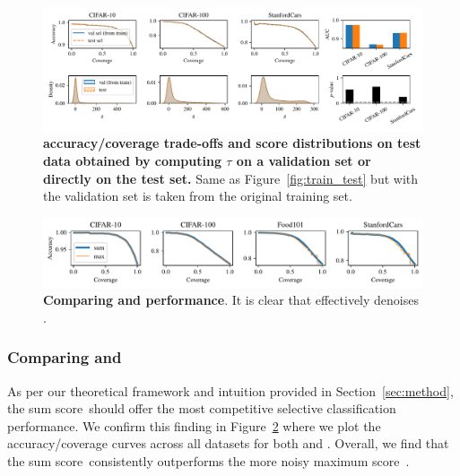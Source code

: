 \begin{figure}[t]
  \centering
  \includegraphics[width=\linewidth]{figs/sptd/train_test_nntd_train.pdf}
\caption[\sptd accuracy/coverage trade-offs and score distributions on test data obtained by computing $\tau$ on a validation set or directly on the test set.]{\textbf{\sptd accuracy/coverage trade-offs and score distributions on test data obtained by computing $\tau$ on a validation set or directly on the test set.} Same as Figure~\ref{fig:train_test} but with the validation set is taken from the original training set.
}
\label{fig:train_test_nntd_train}
\end{figure}

\begin{figure}[t]
\centering
  \includegraphics[width=\linewidth]{figs/sptd/max_sum.pdf}
\caption[\textbf{Comparing \smax and \ssum performance}. It is clear that \ssum effectively denoises \smax.]{\textbf{Comparing \smax and \ssum performance}. It is clear that \ssum effectively denoises \smax.}
\label{fig:sum_v_max}
\end{figure}

\subsubsection{Comparing \smax and \ssum}
\label{sec:max_v_sum}

As per our theoretical framework and intuition provided in Section~\ref{sec:method}, the sum score~\ssum should offer the most competitive selective classification performance. We confirm this finding in Figure~\ref{fig:sum_v_max} where we plot the accuracy/coverage curves across all datasets for both \smax and \ssum. Overall, we find that the sum score~\ssum consistently outperforms the more noisy maximum score~\smax.

